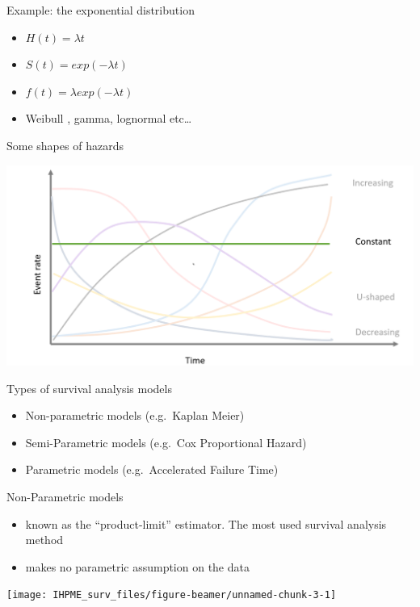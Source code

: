 \documentclass[
  ignorenonframetext,
]{beamer}
\providecommand{\tightlist}{%
  \setlength{\itemsep}{0pt}\setlength{\parskip}{0pt}}
\begin{document}
\begin{frame}{Example: the exponential distribution}
\protect\hypertarget{example-the-exponential-distribution}{}

\begin{itemize}
\item
  \(H(t) = \lambda t\)
\item
  \(S(t) = exp(-\lambda t)\)
\item
  \(f(t) = \lambda exp(-\lambda t)\)
\item
  Weibull , gamma, lognormal etc\ldots{}
\end{itemize}

\end{frame}

\begin{frame}{Some shapes of hazards}
\protect\hypertarget{some-shapes-of-hazards}{}

\includegraphics[width=1\linewidth]{figures/hazards}

\end{frame}

\begin{frame}{Types of survival analysis models}
\protect\hypertarget{types-of-survival-analysis-models}{}

\begin{itemize}
\tightlist
\item
  Non-parametric models (e.g.~Kaplan Meier)
\item
  Semi-Parametric models (e.g.~Cox Proportional Hazard)
\item
  Parametric models (e.g.~Accelerated Failure Time)
\end{itemize}

\end{frame}

\begin{frame}{Non-Parametric models}
\protect\hypertarget{non-parametric-models}{}

\begin{itemize}
\tightlist
\item
  known as the ``product-limit'' estimator. The most used survival
  analysis method
\item
  makes no parametric assumption on the data
\end{itemize}

\texttt{[image: IHPME\_surv\_files/figure-beamer/unnamed-chunk-3-1]}

\end{frame}
\end{document}
